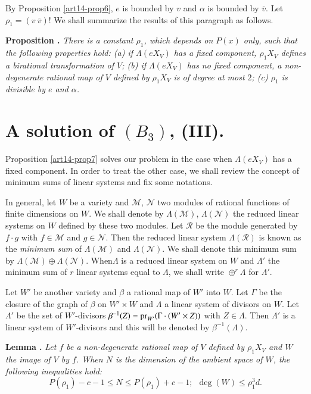 By Proposition \ref{art14-prop6}, $e$ is bounded by $v$ and $\alpha$ is bounded by $\overline{v}$. Let $\rho_{1}=(v \ \overline{v})$! We shall summarize the results of this paragraph as follows.

\medskip
\noindent
{\bf Proposition .\label{art14-prop7}}
{\em There is a constant $\rho_{1}$, which depends on $P(x)$ only, such that the following properties hold: {\rm(a)} if $\Lambda(eX_{V})$ has a fixed component, $\rho_{1}X_{V}$ defines a birational transformation of $V$; {\rm(b)} if $\Lambda(eX_{V})$ has no fixed component, a non-degenerate rational map of $V$ defined by $\rho_{1}X_{V}$ is of degree at most $2$; {\rm(c)} $\rho_{1}$ is divisible by $e$ and $\alpha$.}

\section{A solution of \texorpdfstring{$(B_{3})$}{B3}, (III).}\label{art14-sec7}

Proposition \ref{art14-prop7} solves our problem in the case when $\Lambda(eX_{V})$ has a fixed component. In order to treat the other case, we shall review the concept of minimum sums of linear systems and fix some notations.

In general, let $W$ be a variety and $\mathscr{M}$, $\mathscr{N}$ two modules of rational functions of finite dimensions on $W$. We shall denote by $\Lambda(\mathscr{M})$, $\Lambda(\mathscr{N})$ the reduced linear systems on $W$ defined by these two modules. Let $\mathscr{R}$ be the module generated by $f\cdot g$ with $f\in \mathscr{M}$ and $g\in \mathscr{N}$. Then the reduced linear system $\Lambda(\mathscr{R})$ is known as the {\em minimum sum} of $\Lambda(\mathscr{M})$ and $\Lambda(\mathscr{N})$. We shall denote this minimum sum by $\Lambda(\mathscr{M})\oplus \Lambda(\mathscr{N})$. When\pageoriginale $\Lambda$ is a reduced linear system on $W$ and $\Lambda'$ the minimum sum of $r$ linear systems equal to $\Lambda$, we shall write $\oplus^{r}\Lambda$ for $\Lambda'$.

Let $W'$ be another variety and $\beta$ a rational map of $W'$ into $W$. Let $\Gamma$ be the closure of the graph of $\beta$ on $W'\times W$ and $\Lambda$ a linear system of divisors on $W$. Let $\Lambda'$ be the set of $W'$-divisors $\beta^{-1}(Z)=\operatorname{\mathrm{pr}}_{W'}(\Gamma\cdot (W'\times Z))$ with $Z\in \Lambda$. Then $\Lambda'$ is a linear system of $W'$-divisors and this will be denoted by $\beta^{-1}(\Lambda)$.

\medskip
\noindent
{\bf Lemma .\label{art14-add-lem7}}
{\em Let $f$ be a non-degenerate rational map of $V$ defined by $\rho_{1}X_{V}$ and $W$ the image of $V$ by $f$. When $N$ is the dimension of the ambient space of $W$, the following inequalities hold:}
$$
P(\rho_{1})-c-1\leq N\leq P(\rho_{1})+c-1; \ \ \deg(W)\leq \rho^{3}_{1}d.
$$

